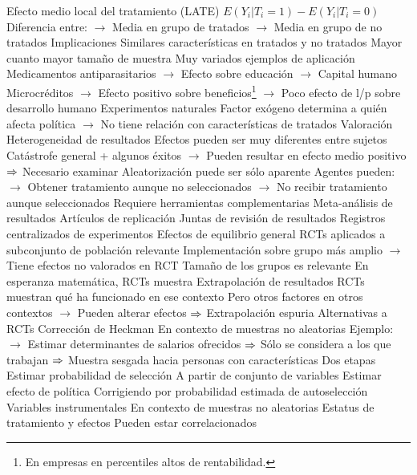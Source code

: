 \documentclass{nuevotema}
\begin{document}
\begin{esquemal}
				\4 Efecto medio local del tratamiento (LATE)
				\4[] $E(Y_i | T_i = 1) - E(Y_i | T_i = 0)$
				\4[] Diferencia entre:
				\4[] $\to$ Media en grupo de tratados
				\4[] $\to$ Media en grupo de no tratados
			\3 Implicaciones
				\4 Similares características en tratados y no tratados
				\4[] Mayor cuanto mayor tamaño de muestra
				\4 Muy variados ejemplos de aplicación
				\4[] Medicamentos antiparasitarios
				\4[] $\to$ Efecto sobre educación $\to$ Capital humano
				\4[] Microcréditos
				\4[] $\to$ Efecto positivo sobre beneficios\footnote{En empresas en percentiles altos de rentabilidad.}
				\4[] $\to$ Poco efecto de l/p sobre desarrollo humano
				\4 Experimentos naturales
				\4[] Factor exógeno determina a quién afecta política
				\4[] $\to$ No tiene relación con características de tratados
			\3 Valoración
				\4 Heterogeneidad de resultados
				\4[] Efectos pueden ser muy diferentes entre sujetos
				\4[] Catástrofe general + algunos éxitos
				\4[] $\to$ Pueden resultar en efecto medio positivo
				\4[] $\Rightarrow$ Necesario examinar
				\4 Aleatorización puede ser sólo aparente
				\4[] Agentes pueden:
				\4[] $\to$ Obtener tratamiento aunque no seleccionados
				\4[] $\to$ No recibir tratamiento aunque seleccionados
				\4 Requiere herramientas complementarias
				\4[] Meta-análisis de resultados
				\4[] Artículos de replicación
				\4[] Juntas de revisión de resultados
				\4[] Registros centralizados de experimentos
				\4 Efectos de equilibrio general
				\4[] RCTs aplicados a subconjunto de población relevante
				\4[] Implementación sobre grupo más amplio
				\4[] $\to$ Tiene efectos no valorados en RCT
				\4 Tamaño de los grupos es relevante
				\4[] En esperanza matemática, RCTs muestra
				\4 Extrapolación de resultados
				\4[] RCTs muestran qué ha funcionado en ese contexto
				\4[] Pero otros factores en otros contextos
				\4[] $\to$ Pueden alterar efectos
				\4[] $\Rightarrow$ Extrapolación espuria
		\2 Alternativas a RCTs
			\3 Corrección de Heckman
				\4 En contexto de muestras no aleatorias
				\4[] Ejemplo:
				\4[] $\to$ Estimar determinantes de salarios ofrecidos
				\4[] $\Rightarrow$ Sólo se considera a los que trabajan
				\4[] $\Rightarrow$ Muestra sesgada hacia personas con características
				\4 Dos etapas
				\4[1ª etapa] Estimar probabilidad de selección
				\4[] A partir de conjunto de variables
				\4[2ª etapa] Estimar efecto de política
				\4[] Corrigiendo por probabilidad estimada de autoselección
			\3 Variables instrumentales
				\4 En contexto de muestras no aleatorias
				\4 Estatus de tratamiento y efectos
				\4[] Pueden estar correlacionados

\end{esquemal}
\end{document}
